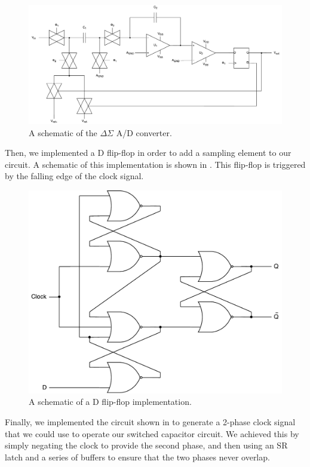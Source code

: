 \documentclass[journal,hidelinks]{IEEEtran}
\begin{document}
\begin{figure}[!htb]
  \centering
  \includegraphics[width=\textwidth]{diagrams/adc.pdf}
  \caption{A schematic of the $\Delta \Sigma$ A/D converter.}
  \label{fig:adc}
\end{figure}

Then, we implemented a D flip-flop in order to add a sampling element to our circuit. A schematic of this implementation is shown in . This flip-flop is triggered by the falling edge of the clock signal.

\begin{figure}[!htb]
  \centering
  \includegraphics[width=0.8\columnwidth]{diagrams/ff.pdf}
  \caption{A schematic of a D flip-flop implementation.}
  \label{fig:ff}
\end{figure}

Finally, we implemented the circuit shown in  to generate a 2-phase clock signal that we could use to operate our switched capacitor circuit. We achieved this by simply negating the clock to provide the second phase, and then using an SR latch and a series of buffers to ensure that the two phases never overlap.
\end{document}
